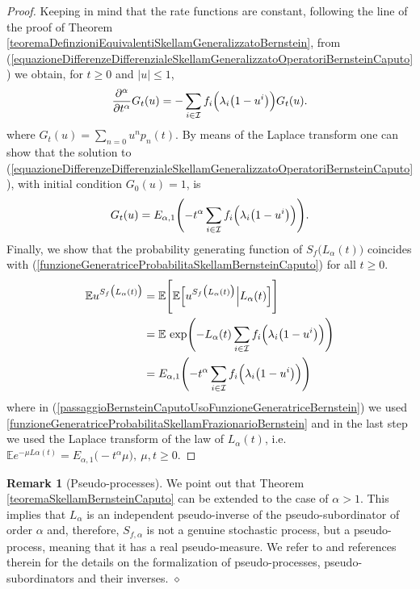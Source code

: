 \documentclass[12pt, twoside, english, headsepline]{article}
\theoremstyle{definition} %
\newtheorem{remark}{Remark}[section] %
\numberwithin{equation}{section} %
\begin{document}
\begin{proof}
Keeping in mind that the rate functions are constant, following the line of the proof of Theorem \ref{teoremaDefinzioniEquivalentiSkellamGeneralizzatoBernstein}, from (\ref{equazioneDifferenzeDifferenzialeSkellamGeneralizzatoOperatoriBernsteinCaputo}) we obtain, for $t\ge0$ and $|u|\le1$,
\begin{align}
 \frac{\partial^\alpha }{\partial t^\alpha}G_t(u) = -\sum_{i\in\mathcal{I}} f_i\Bigl( \lambda_i\big(1-u^i\big) \Bigr)G_t(u).
\end{align}
where $G_t(u) = \sum_{n=0} u^n p_n(t)$. By means of the Laplace transform one can show that the solution to (\ref{equazioneDifferenzeDifferenzialeSkellamGeneralizzatoOperatoriBernsteinCaputo}), with initial condition $G_0(u) =1$, is 
\begin{equation}\label{funzioneGeneratriceProbabilitaSkellamBernsteinCaputo}
G_t(u) = E_{\alpha, 1}\Biggl(-t^\alpha\sum_{i\in\mathcal{I}}f_i\Bigl(\lambda_i\big(1-u^i\big) \Big)\Biggr).
\end{equation}
Finally, we show that the probability generating function of $S_f\big(L_\alpha(t)\big)$ coincides with (\ref{funzioneGeneratriceProbabilitaSkellamBernsteinCaputo}) for all $t\ge0$.
\begin{align}
\mathbb{E}u^{S_f\big(L_\alpha(t)\big)}& = \mathbb{E}\Bigg[\mathbb{E}\Big[u^{S_f\big(L_\alpha(t)\big)}\Big|L_{\alpha}(t)\Big]\Bigg]  \nonumber\\
& = \mathbb{E}\ \text{exp}\Biggl(- L_{\alpha}(t)\sum_{i\in \mathcal{I}}  f_i\Big(\lambda_i\big(1-u^i\big)\Big)\Biggr)     \label{passaggioBernsteinCaputoUsoFunzioneGeneratriceBernstein}\\
& =  E_{\alpha, 1}\Biggl(-t^\alpha\sum_{i\in\mathcal{I}}f_i\Bigl(\lambda_i\big(1-u^i\big) \Big)\Biggr) \nonumber
\end{align}
where in (\ref{passaggioBernsteinCaputoUsoFunzioneGeneratriceBernstein}) we used \eqref{funzioneGeneratriceProbabilitaSkellamFrazionarioBernstein} and in the last step we used the Laplace transform of the law of $L_\alpha(t)$, i.e. $\mathbb{E}e^{-\mu L\alpha(t)} = E_{\alpha, 1}\big(-t^\alpha \mu\big), \ \mu,t\ge0$. 
\end{proof}

\begin{remark}[Pseudo-processes]
We point out that Theorem \ref{teoremaSkellamBernsteinCaputo} can be extended to the case of $\alpha>1$. This implies that $L_\alpha$ is an independent pseudo-inverse of the pseudo-subordinator of order $\alpha$ and, therefore, $S_{f,\alpha}$ is not a genuine stochastic process, but a pseudo-process, meaning that it has a real pseudo-measure. We refer to \cite{CO2025} and references therein for the details on the formalization of pseudo-processes, pseudo-subordinators and their inverses. 
\hfill$\diamond$
\end{remark}
\end{document}
